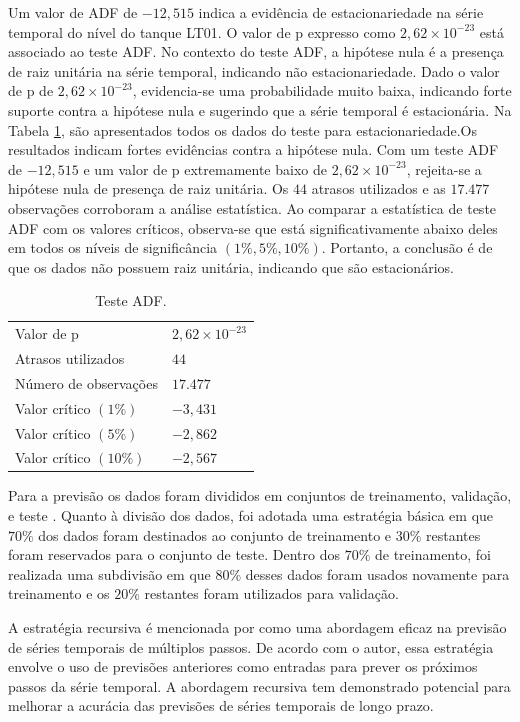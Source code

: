 Um valor de ADF de $-12,515$ indica a evidência de estacionariedade na série temporal do nível do tanque LT01. 
O valor de p expresso como $2,62\times 10^{-23}$ está associado ao teste ADF. No contexto do teste ADF, a hipótese nula é a presença de raiz unitária na série temporal, indicando não estacionariedade. Dado o valor de p de $2,62\times 10^{-23}$, evidencia-se uma probabilidade muito baixa, indicando forte suporte contra a hipótese nula e sugerindo que a série temporal é estacionária. Na Tabela \ref{tb:adf}, são apresentados todos os dados do teste para estacionariedade.Os resultados indicam fortes evidências contra a hipótese nula. Com um teste ADF de $-12,515 $ e um valor de p extremamente baixo de $2,62 \times 10^{-23}$, rejeita-se a hipótese nula de presença de raiz unitária. Os $44$ atrasos utilizados e as $17.477$ observações corroboram a análise estatística. Ao comparar a estatística de teste ADF com os valores críticos, observa-se que está significativamente abaixo deles em todos os níveis de significância $(1\%, 5\%, 10\%)$. Portanto, a conclusão é de que os dados não possuem raiz unitária, indicando que são estacionários.

\begin{table}[!htb]
	\centering
	\caption{Teste ADF.}\label{tb:adf}
	\begin{tabular}{ll}
		\hline
		Valor de p & $2,62 \times 10^{-23}$ \\
		Atrasos utilizados & $44$ \\
		Número de observações & $17.477$ \\
		Valor crítico $(1\%)$ & $-3,431$ \\
		Valor crítico $(5\%)$ & $-2,862$ \\
		Valor crítico $(10\%)$ & $-2,567$ \\
		\hline
	\end{tabular}
\end{table}

Para a previsão os dados foram divididos em conjuntos de treinamento, validação, e teste \cite{raschka2015practical, geron2017hands_on}. Quanto à divisão dos dados, foi adotada uma estratégia básica em que $70\%$ dos dados foram destinados ao conjunto de treinamento e $30\%$ restantes foram reservados para o conjunto de teste. Dentro dos $70\%$ de treinamento, foi realizada uma subdivisão em que $80\%$ desses dados foram usados novamente para treinamento e os $20\%$ restantes foram utilizados para validação. 

A estratégia recursiva é mencionada por  como uma abordagem eficaz na previsão de séries temporais de múltiplos passos. De acordo com o autor, essa estratégia envolve o uso de previsões anteriores como entradas para prever os próximos passos da série temporal. A abordagem recursiva tem demonstrado potencial para melhorar a acurácia das previsões de séries temporais de longo prazo.


